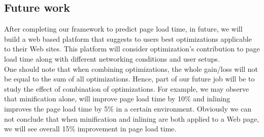 \subsection {Future work}
After completing our framework to predict page load time, in future, we will build a web based platform that suggests to users best optimizations applicable to their Web sites. This platform will consider optimization's contribution to page load time along with different networking conditions and user setups.\\
\noindent  One should note that when combining optimizations, the whole gain/loss will not be equal to the sum of all optimizations. Hence, part of our future job will be to study the effect of combination of optimizations. For example, we may observe that minification alone, will improve page load time by 10\% and inlining improves the page load time by 5\% in a certain environment. Obviously we can not conclude that when minification and inlining are both applied to a Web page, we will see overall 15\% improvement in page load time.

